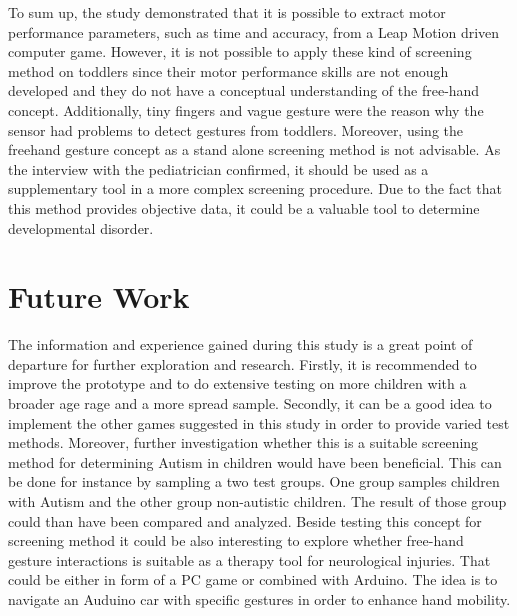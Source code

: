 To sum up, the study demonstrated that it is possible to extract motor performance parameters, such as time and accuracy, from a Leap Motion driven computer game. However, it is not possible to apply these kind of screening method on toddlers since their motor performance skills are not enough developed and they do not have a conceptual understanding of the free-hand concept. Additionally, tiny fingers and vague gesture were the reason why the sensor had problems to detect gestures from toddlers.
Moreover, using the freehand gesture concept as a stand alone screening method is not advisable. As the interview with the pediatrician confirmed, it should be used as a supplementary tool in a more complex screening procedure. Due to the fact that this method provides objective data, it could be a valuable tool to determine developmental disorder.  



\section{Future Work}
\label{sec:future}


The information and experience gained during this study is a great point of departure for further exploration and research.  
Firstly, it is recommended to improve the prototype and to do extensive testing on more children with a broader age rage and a more spread sample. Secondly, it can be a good idea to implement the other games suggested in this study in order to provide varied test methods.
Moreover, further investigation whether this is a suitable screening method for determining Autism in children would have been beneficial. This can be done for instance by sampling a two test groups. One group samples children with Autism and the other group non-autistic children. The result of those group could than have been compared and analyzed. 
Beside testing this concept for screening method it could be also interesting to explore whether free-hand gesture interactions is suitable as a therapy tool for neurological injuries. That could be either in form of a PC game or combined with Arduino. The idea is to navigate an Auduino car with specific gestures in order to enhance hand mobility.  




